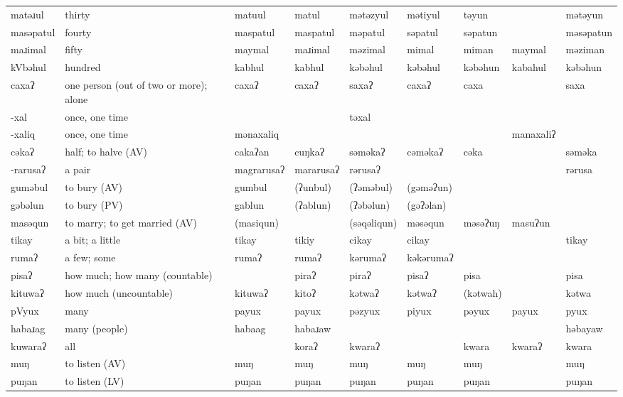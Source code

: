 \begin{landscape}
\begin{longtable}{*{9}{>{\raggedright\arraybackslash}p{}}}
\text{*}matəɹul & thirty & matuul & matul & mətəzyul & mətiyul & təyun &  & mətəyun\\
\text{*}masəpatul & fourty & maspatul & maspatul & məpatul & səpatul & səpatun &  & məsəpatun\\
\text{*}maɹimal & fifty & maymal & maɹimal & məzimal & mimal & miman & maymal & məziman\\
\text{*}kVbəhul & hundred & kabhul & kabhul & kəbəhul & kəbəhul & kəbəhun & kabahul & kəbəhun\\
\text{*}caxaʔ & one person (out of two or more); alone & caxaʔ & caxaʔ & saxaʔ & caxaʔ & caxa &  & saxa\\
\text{*}-xal & once, one time &  &  & təxal &  &  &  & \\
\text{*}-xaliq & once, one time & mənaxaliq &  &  &  &  & manaxaliʔ & \\
\text{*}cəkaʔ & half; to halve (AV) & cakaʔan & cuŋkaʔ & səməkaʔ & cəməkaʔ & cəka &  & səməka\\
\text{*}-rarusaʔ & a pair & magrarusaʔ & mararusaʔ & rərusaʔ &  &  &  & rərusa\\
\text{*}guməbul & to bury (AV) & gumbul & (ʔunbul) & (ʔəməbul) & (gəməʔun) &  &  & \\
\text{*}gəbəlun & to bury (PV) & gablun & (ʔablun) & (ʔəbəlun) & (gəʔəlan) &  &  & \\
\text{*}masəqun & to marry; to get married (AV) & (masiqun) &  & (səqəliqun) & məsəqun & məsəʔuŋ & masuʔun & \\
\text{*}tikay & a bit; a little & tikay & tikiy & cikay & cikay &  &  & tikay\\
\text{*}rumaʔ & a few; some & rumaʔ & rumaʔ & kərumaʔ & kəkərumaʔ &  &  & \\
\text{*}pisaʔ & how much; how many (countable) &  & piraʔ & piraʔ & pisaʔ & pisa &  & pisa\\
\text{*}kituwaʔ & how much (uncountable) & kituwaʔ & kitoʔ & kətwaʔ & kətwaʔ & (kətwah) &  & kətwa\\
\text{*}pVyux & many & payux & payux & pəzyux & piyux & pəyux & payux & pyux\\
\text{*}habaɹag & many (people) & habaag & habaɹaw &  &  &  &  & həbayaw\\
\text{*}kuwaraʔ & all &  & koraʔ & kwaraʔ &  & kwara & kwaraʔ & kwara\\
\text{*}muŋ & to listen (AV) & muŋ & muŋ & muŋ & muŋ & muŋ &  & muŋ\\
\text{*}puŋan & to listen (LV) & puŋan & puŋan & puŋan & puŋan & puŋan &  & puŋan\\

\end{longtable}
\end{landscape}
